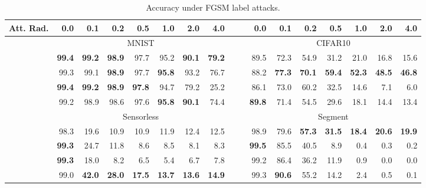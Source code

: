 


\begin{table}[htbp!]
 	\centering
 	\caption{Accuracy under FGSM label attacks.}
 	\begin{small}
 		\begin{tabular}{@{}rrrrrrrrc|crrrrrrr@{}}
 			\toprule
 			Att. Rad. & 0.0 & 0.1 & 0.2 & 0.5 & 1.0 & 2.0 & 4.0 & & & 0.0 & 0.1 & 0.2 & 0.5 & 1.0 & 2.0 & 4.0 \\
 			\midrule
 			& \multicolumn{7}{c}{MNIST} & & & \multicolumn{7}{c}{CIFAR10} \\
 			\PostNet  & \bf{99.4} &  \bf{99.2} &  \bf{98.9} &  97.7 &  95.2 &  \bf{90.1} &  \bf{79.2} & &
 			          & 89.5 &  72.3 &  54.9 &  31.2 &  21.0 &  16.8 &  15.6 \\
 			\PriorNet & 99.3 &  99.1 &  \bf{98.9} &  97.7 &  \bf{95.8} &  93.2 &  76.7 & &
 			          & 88.2 &  \bf{77.3} &  \bf{70.1} &  \bf{59.4} &  \bf{52.3} &  \bf{48.5} &  \bf{46.8} \\
 		    \DDNet    & \bf{99.4} &  \bf{99.2} &  \bf{98.9} &  \bf{97.8} &  94.7 &  79.2 &  25.2 & &
 			          & 86.1 &  73.0 &  60.2 &  32.5 &  14.6 &   7.1 &   6.0 \\
 		    \EvNet    & 99.2 &  98.9 &  98.6 &  97.6 &  \bf{95.8} &  \bf{90.1} &  74.4 & &
 			          & \bf{89.8} &  71.4 &  54.5 &  29.6 &  18.1 &  14.4 &  13.4 \\
 		    \midrule
 		     & \multicolumn{7}{c}{Sensorless} & & & \multicolumn{7}{c}{Segment} \\
 			\PostNet  & 98.3 &  19.6 &  10.9 &  10.9 &  11.9 &  12.4 &  12.5 & &
 			          & 98.9 &  79.6 &  \bf{57.3} &  \bf{31.5} &  \bf{18.4} &  \bf{20.6} &  \bf{19.9} \\
 			\PriorNet & \bf{99.3} &  24.7 &  11.8 &   8.6 &   8.5 &   8.1 &   8.3 & &
 			          & \bf{99.5} &  85.5 &  40.5 &   8.9 &   0.4 &   0.3 &   0.2 \\
 		    \DDNet    & \bf{99.3} &  18.0 &   8.2 &   6.5 &   5.4 &   6.7 &   7.8 & &
 			          & 99.2 &  86.4 &  36.2 &  11.9 &   0.9 &   0.0 &   0.0 \\
 		    \EvNet    & 99.0 &  \bf{42.0} &  \bf{28.0} &  \bf{17.5} &  \bf{13.7} &  \bf{13.6} &  \bf{14.9} & &
 			          & 99.3 &  \bf{90.6} &  55.2 &  14.2 &   2.4 &   0.5 &   0.1 \\
 			\bottomrule
 		\end{tabular}
 	\end{small}
 	\label{tab:acc_label_attack_fgsm}
\end{table}


